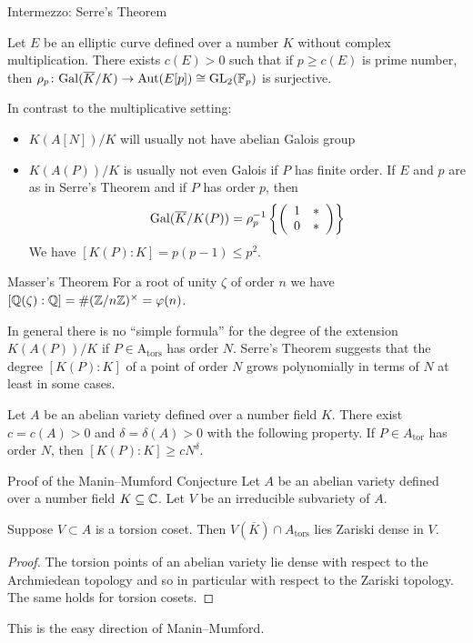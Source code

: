 \documentclass{beamer}
\begin{document}
\begin{frame}{Intermezzo: Serre's Theorem}
  \begin{theorem}[Serre]
    Let $E$ be  an elliptic curve defined over a number $K$
    \alert{without} complex multiplication.
    There exists $c(E)>0$ such that
    if $p\ge c(E)$ is prime number, then $\rho_p \colon
    \mathrm{Gal}(\overline{K}/K)\rightarrow \mathrm{Aut}(E[p]) \cong \mathrm{GL}_2({\mathbb{F}}_p)$
    is surjective.  
  \end{theorem}

  In contrast to the multiplicative setting:
  \begin{itemize}
  \item 
    $K(A[N])/K$ will usually \alert{not} have  abelian Galois group
  \item 
     $K(A(P))/K$ is usually  \alert{not}  even Galois if $P$ has finite
     order. If  $E$
     and $p$ are as in Serre's Theorem and if $P$ has order $p$, then
     \begin{equation*}
       \mathrm{Gal}(\overline K/K(P))=       \rho_p^{-1} \left\{\left( \begin{array}{cc} {1} & {*} \\ {0} & {*} \end{array} \right)\right\}
     \end{equation*}
     We have $[K(P):K] = p(p-1) \le p^2$. 
   \end{itemize}   
\end{frame}

\begin{frame}{Masser's Theorem}
  For a root of unity $\zeta$ of order $n$ we have $[{\mathbb{Q}}(\zeta):{\mathbb{Q}}] =
  \#({\mathbb{Z}}/n{\mathbb{Z}})^\times =\varphi(n)$.
  
  In general there is no ``simple formula'' for the degree of the
  extension $K(A(P))/K$ if $P\in \mathrm{A}_{\mathrm{tors}}$ has order
  $N$.
  Serre's Theorem
  suggests that the degree $[K(P):K]$ of a point of order $N$ grows
  polynomially in terms of $N$ at least in some cases.

  
  \begin{theorem}[Masser]
    Let $A$ be an abelian variety defined over a number field $K$. There
    exist $c=c(A)>0$ and $\delta=\delta(A)>0$ with the following
    property. If $P \in A_{\mathrm{tor}}$ has order $N$, then
    $[K(P):K]\ge c N^{\delta}$. 
  \end{theorem}
\end{frame}

\begin{frame}{Proof of the Manin--Mumford Conjecture}
  Let $A$ be an abelian variety defined over a number field
  $K\subseteq{\mathbb{C}}$.
  Let $V$ be an irreducible subvariety of $A$.

  
  \begin{lemma}
    Suppose $V\subset A$ is a torsion coset. Then $V(\overline K)\cap
    A_{\mathrm{tors}}$ lies Zariski dense in $V$. 
  \end{lemma}
  \begin{proof}
    The torsion points of an abelian variety lie dense with respect to
    the Archmiedean topology and so in particular with respect to the
    Zariski topology. The same holds for torsion cosets. 
  \end{proof}

  This is the easy direction of Manin--Mumford. 
\end{frame}
\end{document}
